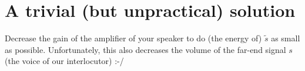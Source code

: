 \section{A trivial (but unpractical) solution}

Decrease the gain of the amplifier of your speaker to do (the energy
of) $\tilde{s}$ as small as possible. Unfortunately, this also
decreases the volume of the far-end signal $s$ (the voice of our
interlocutor) :-/
